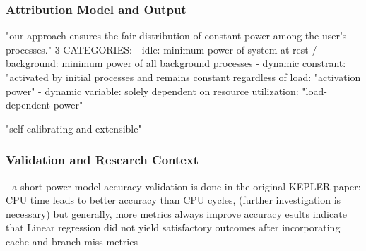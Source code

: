 



\subsubsection{Attribution Model and Output}
\label{sec:kepler-attribution}
"our approach ensures the fair distribution of constant power among the user’s processes."
3 CATEGORIES:
- idle: minimum power of system at rest / background: minimum power of all background processes
- dynamic constrant: "activated by initial processes and remains constant regardless of load: "activation power"
- dynamic variable: solely dependent on resource utilization: "load-dependent power"

"self-calibrating and extensible"

\subsubsection{Validation and Research Context}
\label{sec:kepler-validation}
- a short power model accuracy validation is done in the original KEPLER paper:
    CPU time leads to better accuracy than CPU cycles, (further investigation is necessary)
    but generally, more metrics always improve accuracy
    esults indicate that Linear regression did not yield satisfactory outcomes after incorporating cache and branch miss metrics


